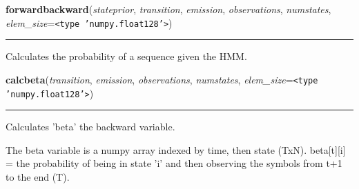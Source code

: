     \label{QSTK:qstklearn:hmm:forwardbackward}

    \vspace{0.5ex}

\hspace{.8\funcindent}\begin{boxedminipage}{\funcwidth}

    \raggedright \textbf{forwardbackward}(\textit{stateprior}, \textit{transition}, \textit{emission}, \textit{observations}, \textit{numstates}, \textit{elem\_size}={\tt {\textless}type 'numpy.float128'{\textgreater}})

    \vspace{-1.5ex}

    \rule{\textwidth}{0.5\fboxrule}
\setlength{\parskip}{2ex}
    Calculates the probability of a sequence given the HMM.

\setlength{\parskip}{1ex}
    \end{boxedminipage}

    \label{QSTK:qstklearn:hmm:calcbeta}

    \vspace{0.5ex}

\hspace{.8\funcindent}\begin{boxedminipage}{\funcwidth}

    \raggedright \textbf{calcbeta}(\textit{transition}, \textit{emission}, \textit{observations}, \textit{numstates}, \textit{elem\_size}={\tt {\textless}type 'numpy.float128'{\textgreater}})

    \vspace{-1.5ex}

    \rule{\textwidth}{0.5\fboxrule}
\setlength{\parskip}{2ex}
    Calculates 'beta' the backward variable.

    The beta variable is a numpy array indexed by time, then state (TxN). 
    beta[t][i] = the probability of being in state 'i' and then observing 
    the symbols from t+1 to the end (T).

\setlength{\parskip}{1ex}
    \end{boxedminipage}

    \label{QSTK:qstklearn:hmm:calcxi}

